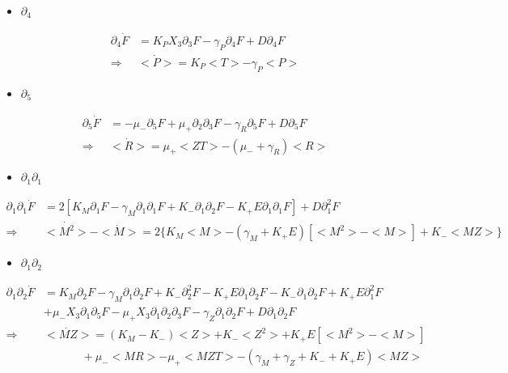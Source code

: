 \documentclass{article}
\begin{document}
\begin{itemize}
    \item $\partial_4$
\end{itemize}
\begin{align*}
    \partial_4\Dot{F} &= K_PX_3\partial_3F - \gamma_P\partial_4F + D\partial_4F\\
    \Longrightarrow   & <\Dot{P}> = K_P<T> - \gamma_P<P>
\end{align*}

\begin{itemize}
    \item $\partial_5$
\end{itemize}
\begin{align*}
    \partial_5\Dot{F} &= -\mu_-\partial_5F + \mu_+\partial_2\partial_3F - \gamma_R\partial_5F + D\partial_5F\\
    \Longrightarrow   & <\Dot{R}> = \mu_+<ZT> - (\mu_- + \gamma_R)<R>
\end{align*}

\begin{itemize}
    \item $\partial_1\partial_1$
\end{itemize}
\begin{align*}
    \partial_1\partial_1\Dot{F} &= 2[K_M\partial_1F - \gamma_M\partial_1\partial_1F + K_-\partial_1\partial_2F - K_+E\partial_1\partial_1F] + D\partial_1^2F\\
    \Longrightarrow             & <\Dot{M^2}> - <\Dot{M}> = 2\{K_M<M> - (\gamma_M + K_+E)[<M^2>-<M>] + K_-<MZ>\}
\end{align*}

\begin{itemize}
    \item $\partial_1\partial_2$
\end{itemize}
\begin{align*}
    \partial_1\partial_2\Dot{F} &= K_M\partial_2F - \gamma_M\partial_1\partial_2F + K_-\partial_2^2F - K_+E\partial_1\partial_2F - K_-\partial_1\partial_2F + K_+E\partial_1^2F\\
                                &+ \mu_-X_3\partial_1\partial_5F - \mu_+X_3\partial_1\partial_2\partial_3F - \gamma_Z\partial_1\partial_2F + D\partial_1\partial_2F\\
                \Longrightarrow & <\Dot{MZ}> = (K_M - K_-)<Z> + K_-<Z^2> + K_+E[<M^2>-<M>]\\
                                & \hspace{40pt}+ \mu_-<MR> - \mu_+<MZT> - (\gamma_M + \gamma_Z + K_- + K_+E)<MZ>
\end{align*}
\end{document}
